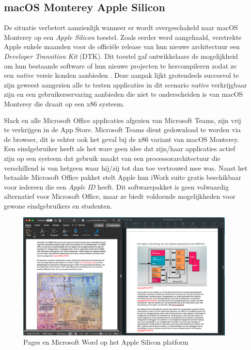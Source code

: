 \subsection{macOS Monterey Apple Silicon}
De situatie verbetert aanzienlijk wanneer er wordt overgeschakeld naar macOS Monterey op een \textit{Apple Silicon} toestel. Zoals eerder werd aangehaald, verstrekte Apple enkele maanden voor de officiële release van hun nieuwe architectuur een \textit{Developer Transition Kit} (DTK). Dit toestel gaf ontwikkelaars de mogelijkheid om hun bestaande software of hun nieuwe projecten te hercompileren zodat ze een \textit{native} versie konden aanbieden \autocite{Apple2020}. Deze aanpak lijkt grotendeels succesvol te zijn geweest aangezien alle te testen applicaties in dit scenario \textit{native} verkrijgbaar zijn en een gebruikerservaring aanbieden die niet te onderscheiden is van macOS Monterey die draait op een x86 systeem.

Slack en alle Microsoft Office applicaties afgezien van Microsoft Teams, zijn vrij te verkrijgen in de App Store. Microsoft Teams dient gedownload te worden via de browser, dit is echter ook het geval bij de x86 variant van macOS Monterey. Een eindgebruiker heeft als het ware geen idee dat zijn/haar applicaties actief zijn op een systeem dat gebruik maakt van een processorarchitectuur die verschillend is van hetgeen waar hij/zij tot dan toe vertrouwd mee was. Naast het betaalde Microsoft Office pakket stelt Apple hun iWork suite gratis beschikbaar voor iedereen die een \textit{Apple ID} heeft. Dit softwarepakket is geen volwaardig alternatief voor Microsoft Office, maar ze biedt voldoende mogelijkheden voor gewone eindgebruikers en studenten.

\begin{figure}[!h]
	\centering
	\includegraphics[width=110mm, scale=0.7]{img/office_macOSM1.png}
	\caption{Pages en Microsoft Word op het Apple Silicon platform}
\end{figure}

